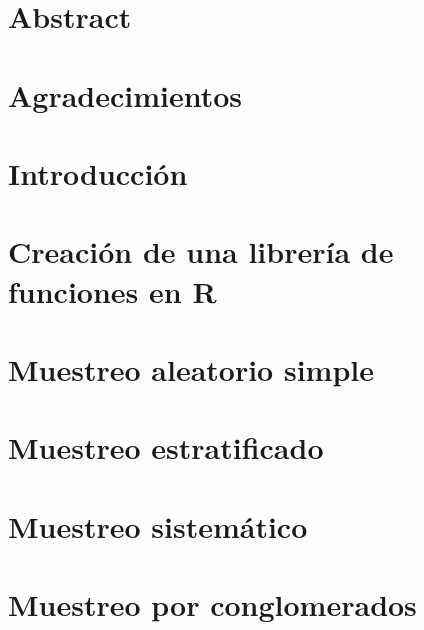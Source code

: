 \documentclass[12pt,twoside]{report}
\begin{document}


\newpage
{}
\setcounter{page}{1}
\chapter*{Abstract}


\chapter*{Agradecimientos}


\newpage
\renewcommand*\contentsname{Tabla de contenidos}
\tableofcontents
\newpage

\listoffigures
\newpage

\renewcommand{\listtablename}{Índice de tablas}
\listoftables
\newpage



\setcounter{page}{1}

\chapter{Introducción}



\newpage
\chapter{Creación de una librería de funciones en R}




\newpage
\chapter{Muestreo aleatorio simple}



\newpage
\chapter{Muestreo estratificado}



\newpage
\chapter{Muestreo sistemático}





\newpage
\chapter{Muestreo por conglomerados}

\end{document}
